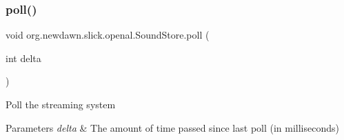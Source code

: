 \subsubsection{\texorpdfstring{poll()}{poll()}}
{\footnotesize\ttfamily void org.\+newdawn.\+slick.\+openal.\+Sound\+Store.\+poll (\begin{DoxyParamCaption}\item[{int}]{delta }\end{DoxyParamCaption})\hspace{0.3cm}{\ttfamily [inline]}}

Poll the streaming system


\begin{DoxyParams}{Parameters}
{\em delta} & The amount of time passed since last poll (in milliseconds) \\
\hline
\end{DoxyParams}

